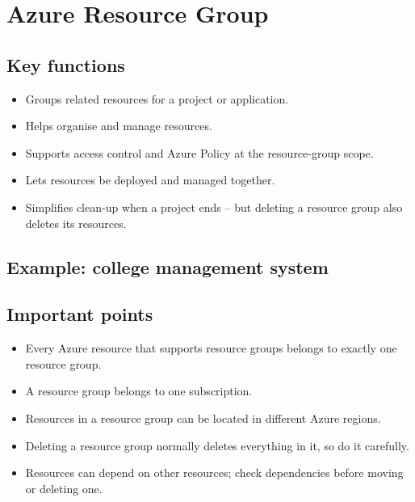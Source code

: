 \documentclass[11pt,a4paper]{article}
\begin{document}

\section{Azure Resource Group}


\subsection{Key functions}

\begin{itemize}\itemsep2pt
  \item Groups related resources for a project or application.
  \item Helps organise and manage resources.
  \item Supports access control and Azure Policy at the resource-group scope.
  \item Lets resources be deployed and managed together.
  \item Simplifies clean-up when a project ends -- but deleting a resource group also deletes
        its resources.
\end{itemize}

\subsection{Example: college management system}

\subsection{Important points}

\begin{itemize}\itemsep2pt
  \item Every Azure resource that supports resource groups belongs to exactly one resource
        group.
  \item A resource group belongs to one subscription.
  \item Resources in a resource group can be located in different Azure regions.
  \item Deleting a resource group normally deletes everything in it, so do it carefully.
  \item Resources can depend on other resources; check dependencies before moving or
        deleting one.
\end{itemize}
\end{document}
